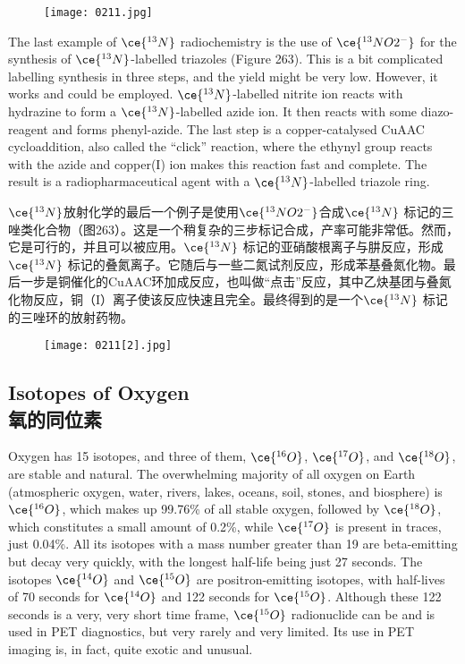 \documentclass[dvipsnames, svgnames,a4paper,11pt]{article}
\begin{document}
\begin{figure}[h]
	\centering
    \texttt{[image: 0211.jpg]} 
 \label{fig262}
\end{figure}

The last example of \(\ce{^{13}N}\) radiochemistry is the use of \(\ce{^{13}NO2^{-}}\) for the synthesis of \(\ce{^{13}N}\)-labelled triazoles (Figure 263). This is a bit complicated labelling synthesis in three steps, and the yield might be very low. However, it works and could be employed. \(\ce{^{13}N}\)-labelled nitrite ion reacts with hydrazine to form a \(\ce{^{13}N}\)-labelled azide ion. It then reacts with some diazo-reagent and forms phenyl-azide. The last step is a copper-catalysed CuAAC cycloaddition, also called the “click” reaction, where the ethynyl group reacts with the azide and copper(I) ion makes this reaction fast and complete. The result is a radiopharmaceutical agent with a \(\ce{^{13}N}\)-labelled triazole ring.

\(\ce{^{13}N}\)放射化学的最后一个例子是使用\(\ce{^{13}NO2^{-}}\)合成\(\ce{^{13}N}\) 标记的三唑类化合物（图263）。这是一个稍复杂的三步标记合成，产率可能非常低。然而，它是可行的，并且可以被应用。\(\ce{^{13}N}\) 标记的亚硝酸根离子与肼反应，形成\(\ce{^{13}N}\) 标记的叠氮离子。它随后与一些二氮试剂反应，形成苯基叠氮化物。最后一步是铜催化的CuAAC环加成反应，也叫做“点击”反应，其中乙炔基团与叠氮化物反应，铜（I）离子使该反应快速且完全。最终得到的是一个\(\ce{^{13}N}\) 标记的三唑环的放射药物。

\begin{figure}[h]
	\centering
    \texttt{[image: 0211[2].jpg]} 
     \label{fig263}
\end{figure}


\subsection{Isotopes of Oxygen \\氧的同位素}  
Oxygen has 15 isotopes, and three of them, \(\ce{^{16}O}\), \(\ce{^{17}O}\), and \(\ce{^{18}O}\), are stable and natural. The overwhelming majority of all oxygen on Earth (atmospheric oxygen, water, rivers, lakes, oceans, soil, stones, and biosphere) is \(\ce{^{16}O}\), which makes up 99.76\% of all stable oxygen, followed by \(\ce{^{18}O}\), which constitutes a small amount of 0.2\%, while \(\ce{^{17}O}\) is present in traces, just 0.04\%. All its isotopes with a mass number greater than 19 are beta-emitting but decay very quickly, with the longest half-life being just 27 seconds. The isotopes \(\ce{^{14}O}\) and \(\ce{^{15}O}\) are positron-emitting isotopes, with half-lives of 70 seconds for \(\ce{^{14}O}\) and 122 seconds for \(\ce{^{15}O}\). Although these 122 seconds is a very, very short time frame, \(\ce{^{15}O}\) radionuclide can be and is used in PET diagnostics, but very rarely and very limited. Its use in PET imaging is, in fact, quite exotic and unusual.
\end{document}

